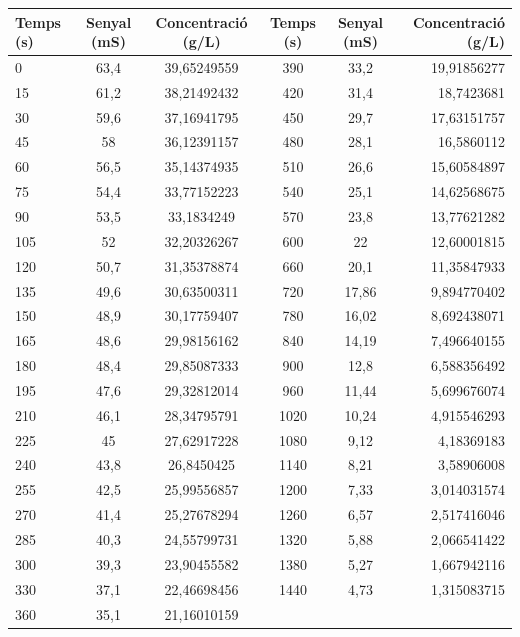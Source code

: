 \documentclass[10pt, twoside]{article}
\begin{document}
\begin{minipage}{\textwidth}
    \centering
    \captionsetup{hypcap=false}
   
    \label{tab:taulaconc500}
    \begin{tabular}{|l|c|c|c|c|r|}
        \hline
        Temps (s)	&	Senyal (mS)	&	Concentració (g/L)	&	Temps (s)	&	Senyal (mS)	&	Concentració (g/L)	\\ \hline
        0	&	63,4	&	39,65249559	&	390	&	33,2	&	19,91856277	\\ \hline
        15	&	61,2	&	38,21492432	&	420	&	31,4	&	18,7423681	\\ \hline
        30	&	59,6	&	37,16941795	&	450	&	29,7	&	17,63151757	\\ \hline
        45	&	58	&	36,12391157	&	480	&	28,1	&	16,5860112	\\ \hline
        60	&	56,5	&	35,14374935	&	510	&	26,6	&	15,60584897	\\ \hline
        75	&	54,4	&	33,77152223	&	540	&	25,1	&	14,62568675	\\ \hline
        90	&	53,5	&	33,1834249	&	570	&	23,8	&	13,77621282	\\ \hline
        105	&	52	&	32,20326267	&	600	&	22	&	12,60001815	\\ \hline
        120	&	50,7	&	31,35378874	&	660	&	20,1	&	11,35847933	\\ \hline
        135	&	49,6	&	30,63500311	&	720	&	17,86	&	9,894770402	\\ \hline
        150	&	48,9	&	30,17759407	&	780	&	16,02	&	8,692438071	\\ \hline
        165	&	48,6	&	29,98156162	&	840	&	14,19	&	7,496640155	\\ \hline
        180	&	48,4	&	29,85087333	&	900	&	12,8	&	6,588356492	\\ \hline
        195	&	47,6	&	29,32812014	&	960	&	11,44	&	5,699676074	\\ \hline
        210	&	46,1	&	28,34795791	&	1020	&	10,24	&	4,915546293	\\ \hline
        225	&	45	&	27,62917228	&	1080	&	9,12	&	4,18369183	\\ \hline
        240	&	43,8	&	26,8450425	&	1140	&	8,21	&	3,58906008	\\ \hline
        255	&	42,5	&	25,99556857	&	1200	&	7,33	&	3,014031574	\\ \hline
        270	&	41,4	&	25,27678294	&	1260	&	6,57	&	2,517416046	\\ \hline
        285	&	40,3	&	24,55799731	&	1320	&	5,88	&	2,066541422	\\ \hline
        300	&	39,3	&	23,90455582	&	1380	&	5,27	&	1,667942116	\\ \hline
        330	&	37,1	&	22,46698456	&	1440	&	4,73	&	1,315083715	\\ \hline
        360	&	35,1	&	21,16010159	&		&		&		\\ \hline				
    \end{tabular}
\end{minipage}
\end{document}
